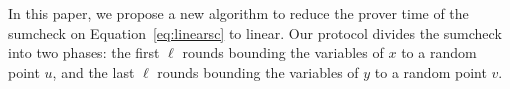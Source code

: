 %

In this paper, we propose a new algorithm to reduce the prover time of the sumcheck on Equation~\ref{eq:linearsc} to linear. Our protocol divides the sumcheck into two phases: the first $\ell$ rounds bounding the variables of $x$ to a random point $u$, and the last $\ell$ rounds bounding the variables of $y$ to a random point $v$.

